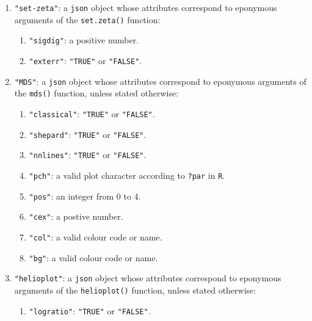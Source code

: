 \begin{refsection}
\begin{enumerate}[leftmargin=\parindent,align=left,
      labelwidth=\parindent,label*=2.\arabic*.]
\begin{enumerate}[leftmargin=\parindent,align=left,
      labelwidth=\parindent,label*=\arabic*.]
  \item{\tt "pch"}: either \texttt{"none"} or a valid plot character
    according to \texttt{?par} in \texttt{R}.
  \item{\tt "verticals"}: \texttt{"TRUE"} or \texttt{"FALSE"}.
  \item{\tt "colmap"}: the name of a valid colour palette to be passed
    on to the \texttt{col} argument of the \texttt{cad()} function.
  \end{enumerate}  
\item{\tt "set-zeta"}: a \texttt{json} object whose attributes
  correspond to eponymous arguments of the \texttt{set.zeta()}
  function:
  \begin{enumerate}[leftmargin=\parindent,align=left,
      labelwidth=\parindent,label*=\arabic*.]
    \item{\tt "sigdig"}: a positive number.
    \item{\tt "exterr"}: \texttt{"TRUE"} or \texttt{"FALSE"}.
  \end{enumerate}  
\item{\tt "MDS"}: a \texttt{json} object whose attributes correspond
  to eponymous arguments of the \texttt{mds()} function, unless stated
  otherwise:
  \begin{enumerate}[leftmargin=\parindent,align=left,
      labelwidth=\parindent,label*=\arabic*.]
    \item{\tt "classical"}: \texttt{"TRUE"} or \texttt{"FALSE"}.
    \item{\tt "shepard"}: \texttt{"TRUE"} or \texttt{"FALSE"}.
    \item{\tt "nnlines"}: \texttt{"TRUE"} or \texttt{"FALSE"}.
    \item{\tt "pch"}: a valid plot character according to
      \texttt{?par} in \texttt{R}.
    \item{\tt "pos"}: an integer from 0 to 4.
    \item{\tt "cex"}: a postive number.
    \item{\tt "col"}: a valid colour code or name.
    \item{\tt "bg"}: a valid colour code or name.
  \end{enumerate}
\item{\tt "helioplot"}: a \texttt{json} object whose attributes
  correspond to eponymous arguments of the \texttt{helioplot()}
  function, unless stated otherwise:
  \begin{enumerate}[leftmargin=\parindent,align=left,
      labelwidth=\parindent,label*=\arabic*.]
    \item{\tt "logratio"}: \texttt{"TRUE"} or \texttt{"FALSE"}.

\end{enumerate}
\end{enumerate}
\end{refsection}
